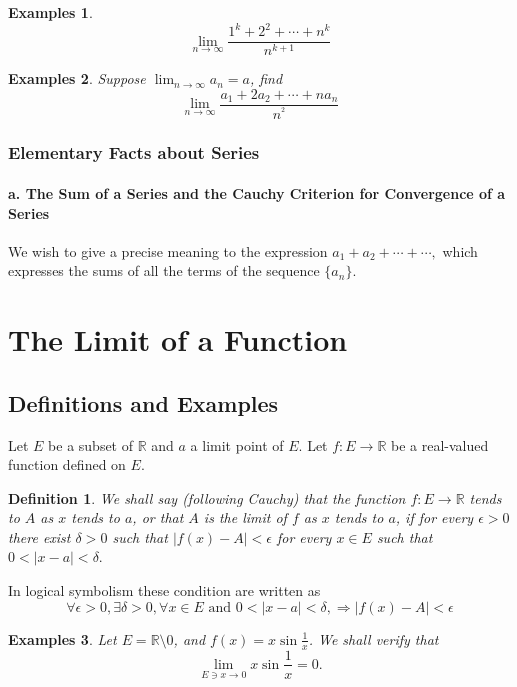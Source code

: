 \documentclass[a4paper,12pt]{article} %
\newtheorem{definition}{Definition}[section]
\newtheorem{example}{Examples}
\begin{document}
\begin{example}
    \[\lim_{n \to \infty} \frac{1^k+2^2+\cdots+n^k}{n^{k+1}}\]
\end{example}

\begin{example}
    Suppose $\displaystyle \lim_{n \to \infty} a_n = a$, find
    \[\lim_{n \to \infty} \frac{a_1+2a_2+\cdots+na_n}{n^{^2}}\]
\end{example}
\subsubsection{Elementary Facts about Series}
\paragraph{{\rm \textbf{a. The Sum of a Series and the Cauchy Criterion for 
Convergence of a Series}}}
We wish to give a precise meaning to the expression $a_1 + a_2 + \cdots + \cdots,$
which expresses the sums of all the terms of the sequence $\{a_n\}$.

\section{The Limit of a Function}
\subsection{Definitions and Examples}
Let $E$ be a subset of $\mathbb{R}$ and $a$ a limit point of $E$.
Let $f: E \to \mathbb{R}$ be a real-valued function defined on $E$.

\begin{definition}
    We shall say (following Cauchy) that the function $f: E \to \mathbb{R}$ 
    tends to $A$ as $x$ tends to $a$, or that $A$ is the limit of $f$ as $x$ 
    tends to $a$, if for every $\epsilon > 0$ there exist $\delta > 0$ 
such that $|f(x) - A| < \epsilon$ for every $x \in E$ such that $0 < |x - a| < \delta.$
\end{definition}

In logical symbolism these condition are written as 
\[\forall \epsilon > 0, \exists \delta > 0, \forall x \in E \text{ and } 
0 < |x - a| < \delta, \Rightarrow |f(x) - A| < \epsilon \]

\begin{example}
    Let $E = \mathbb{R} \setminus 0$, and $\displaystyle f(x) = x\sin \frac{1}{x}$. We 
    shall verify that \[ \lim_{E \ni x \to 0} x\sin \frac{1}{x} = 0.\]
\end{example}
\end{document}
